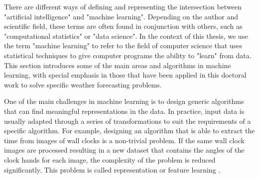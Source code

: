 \medskip

There are different ways of defining and representing the intersection between "artificial intelligence" and "machine learning". Depending on the author and scientific field, these terms are often found in conjunction with others, such as "computational statistics" or "data science". In the context of this thesis, we use the term "machine learning" to refer to the field of computer science that uses statistical techniques to give computer programs the ability to "learn" from data. This section introduces some of the main areas and algorithms in machine learning, with special emphasis in those that have been applied in this doctoral work to solve specific weather forecasting problems.

\medskip

One of the main challenges in machine learning is to design generic algorithms that can find meaningful representations in the data. In practice, input data is usually adapted through a series of transformations to suit the requirements of a specific algorithm. For example, designing an algorithm that is able to extract the time from images of wall clocks is a non-trivial problem. If the same wall clock images are processed resulting in a new dataset that contains the angles of the clock hands for each image, the complexity of the problem is reduced significantly. This problem is called representation or feature learning \citep{bengio2013representation}.

\bigskip
\bigskip


\bigskip
\bigskip

